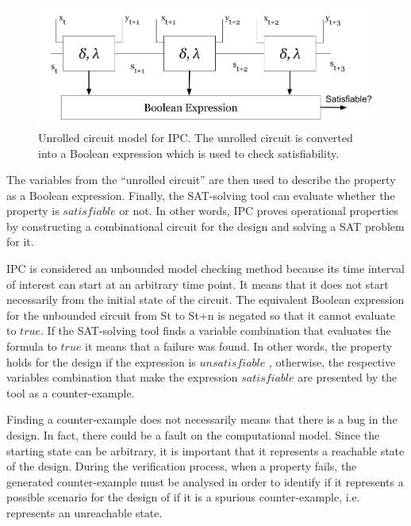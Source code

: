 \begin{figure}[htb!]
	\centering
	\includegraphics[width=\textwidth]{images/unrolled_circuit.png}
	\caption{Unrolled circuit model for IPC. The unrolled circuit is converted into a Boolean expression which is used to check satisfiability.}
	\label{fig:unrolled}
\end{figure}

The variables from the “unrolled circuit” are then used to describe the property as a Boolean expression. Finally, the SAT-solving tool can evaluate whether the property is $satisfiable$ or not. In other words, IPC proves operational properties by constructing a combinational circuit for the design and solving a SAT problem for it. 

IPC is considered an unbounded model checking method because its time interval of interest can start at an arbitrary time point. It means that it does not start necessarily from the initial state of the circuit. The equivalent Boolean expression for the unbounded circuit from St to St+n is negated so that it cannot evaluate to $true$. If the SAT-solving tool finds a variable combination that evaluates the formula to $true$ it means that a failure was found. In other words, the property holds for the design if the expression is $unsatisfiable$ , otherwise, the respective variables combination that make the expression $satisfiable$ are presented by the tool as a counter-example.

Finding a counter-example does not necessarily means that there is a bug in the design. In fact, there could be a fault  on the computational model. Since the starting state  can be arbitrary, it is important that it represents a reachable state of the design. During the verification process, when a property fails, the generated counter-example must be analysed in order to identify if it represents a possible scenario for the design of if it is a spurious counter-example, i.e.   represents an unreachable state.

